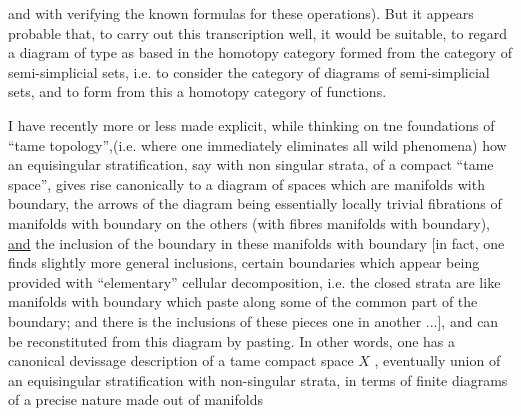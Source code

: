 
and with verifying the known formulas for these operations).
But it appears probable that, to carry out this transcription well,
it would be suitable, to regard a diagram of type
\diagram{\begin{tikzcd}
  \cdot \ar[r]\ar[d] \& {} \\
  {} \&
\end{tikzcd}}
as based in the homotopy category formed from the category of
semi-simplicial sets, i.e. to consider the category of diagrams
of semi-simplicial sets, and to form from this a homotopy category
of functions.

I have recently more or less made explicit, while thinking
on tne foundations of ``tame topology'',(i.e. where one immediately
eliminates all wild phenomena) how an equisingular stratification,
say with non singular strata, of a compact ``tame  space'', gives
rise canonically to a diagram of spaces which are manifolds with
boundary, the arrows of the diagram being essentially locally
trivial fibrations of manifolds with boundary on the others (with
fibres manifolds with boundary), \uline{and} the inclusion of the boundary
in these manifolds with boundary [in fact, one finds slightly
more general inclusions, certain boundaries which appear being
provided with ``elementary'' cellular decomposition, i.e. the
closed strata are like manifolds with boundary which paste along
some of the common part of the boundary; and there is
\hspace*{20em} the inclusions of these pieces
one in another ...], and can be reconstituted from this diagram
by pasting.  In other words, one has a canonical devissage
description of a tame compact space  $X$ , eventually union of an
equisingular stratification with non-singular strata, in terms
of finite diagrams of a precise nature made out of manifolds

